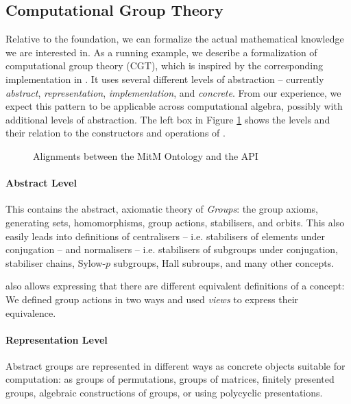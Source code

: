 \subsection{Computational Group Theory}\label{sec:onto:group}

Relative to the foundation, we can formalize the actual mathematical knowledge we are interested in.
As a running example, we describe a formalization of computational group theory (CGT), which is inspired by the corresponding implementation in \GAP.
It uses several different levels of abstraction -- currently \emph{abstract}, \emph{representation}, \emph{implementation}, and \emph{concrete}.
From our experience, we expect this pattern to be applicable across computational algebra, possibly with additional levels of abstraction. 
The left box in Figure \ref{fig:cgtontology} shows the levels and their relation to the constructors and operations of \GAP. 

\begin{figure}[ht]\centering
  \caption{Alignments between the MitM Ontology and the \GAP API}\label{fig:cgtontology}
\end{figure}

\paragraph{Abstract Level} This contains the abstract, axiomatic theory of \emph{Groups}: the group axioms, generating sets, homomorphisms, group actions, stabilisers, and orbits.
This also easily leads into definitions of centralisers -- i.e. stabilisers of elements under conjugation -- and normalisers -- i.e. stabilisers of subgroups under conjugation, stabiliser chains, Sylow-$p$ subgroups, Hall subroups, and many other concepts.

\OMMT also allows expressing that there are different equivalent definitions of a concept: We defined group actions in two ways and used \emph{views} to express their equivalence.

\paragraph{Representation Level} 
Abstract groups are represented in different ways as concrete objects suitable for computation: as groups of permutations, groups of matrices, finitely presented groups, algebraic constructions of groups, or using polycyclic presentations.

